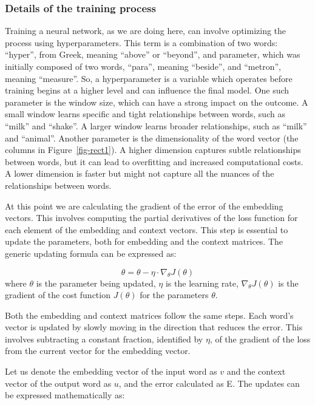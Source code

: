 \subsubsection{Details of the training process}\label{training-process-details}

Training a neural network, as we are doing here, can involve
optimizing the process using hyperparameters. This term is a combination of
two words: ``hyper'', from Greek, meaning ``above'' or ``beyond'', and
parameter, which was initially composed of two words, ``para'', meaning
``beside'', and ``metron'', meaning ``measure''. So, a hyperparameter is
a variable which operates before training begins at a higher level and
can influence the final model. One such parameter is the window size,
which can have a strong impact on the outcome. A small window learns
specific and tight relationships between words, such as ``milk'' and
``shake''. A larger window learns broader relationships, such as ``milk''
and ``animal''. Another parameter is the dimensionality of the word
vector (the columns in Figure~\ref{fig-rect1}). A higher dimension
captures subtle relationships between words, but it can lead to
overfitting and increased computational costs. A lower dimension is
faster but might not capture all the nuances of the relationships
between words.

At this point we are calculating the gradient of the error of the embedding vectors. This involves
computing the partial derivatives of the loss function for
each element of the embedding and context vectors. This step is
essential to update the parameters, both for embedding and the context
matrices. The generic updating formula can be expressed as:

\[
\theta = \theta - \eta \cdot \nabla_{\theta} J(\theta)
\] where \(\theta\) is the parameter being updated, \(\eta\) is the
learning rate, \(\nabla_{\theta} J(\theta)\) is the gradient of the cost
function \(J(\theta)\) for the parameters \(\theta\).

Both the embedding and context matrices follow the same steps. Each
word's vector is updated by slowly moving in the direction that reduces
the error. This involves subtracting a constant fraction, identified by
\(\eta\), of the gradient of the loss from the current vector for the embedding
vector.

Let us denote the embedding vector of the input word as \(v\) and the
context vector of the output word as \(u\), and the error calculated as
E. The updates can be expressed mathematically as:


